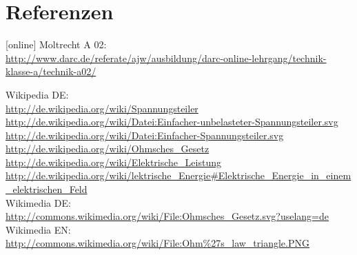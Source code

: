 \section{Referenzen}
	\begin{small}
    \begin{thebibliography}{}
    [online]
      Moltrecht A 02: \\
                    \url{http://www.darc.de/referate/ajw/ausbildung/darc-online-lehrgang/technik-klasse-a/technik-a02/}
                    
        Wikipedia DE: \\
                    \url{http://de.wikipedia.org/wiki/Spannungsteiler}\\
                    \url{http://de.wikipedia.org/wiki/Datei:Einfacher-unbelasteter-Spannungsteiler.svg}\\
                    \url{http://de.wikipedia.org/wiki/Datei:Einfacher-Spannungsteiler.svg}\\
      				\url{http://de.wikipedia.org/wiki/Ohmsches_Gesetz}\\ 
                    \url{http://de.wikipedia.org/wiki/Elektrische_Leistung}\\ 
                    \url{http://de.wikipedia.org/wiki/lektrische_Energie#Elektrische_Energie_in_einem_elektrischen_Feld}\\ 
                    
    	Wikimedia DE:\\
    				\url{http://commons.wikimedia.org/wiki/File:Ohmsches_Gesetz.svg?uselang=de}\\
   		Wikimedia EN:\\
   					\url{http://commons.wikimedia.org/wiki/File:Ohm\%27s_law_triangle.PNG}
   \end{thebibliography}
	\end{small}


